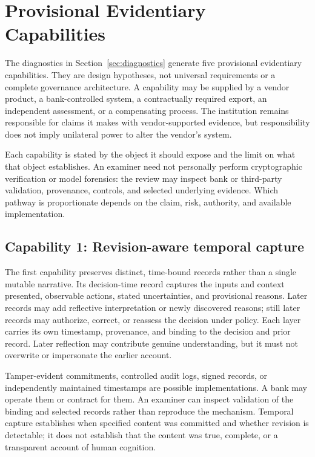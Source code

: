 
\section{Provisional Evidentiary Capabilities}
\label{sec:primitives}

The diagnostics in Section~\ref{sec:diagnostics} generate five provisional
evidentiary capabilities. They are design hypotheses, not universal
requirements or a complete governance architecture. A capability may be
supplied by a vendor product, a bank-controlled system, a contractually required
export, an independent assessment, or a compensating process. The institution
remains responsible for claims it makes with vendor-supported evidence, but
responsibility does not imply unilateral power to alter the vendor's system.

Each capability is stated by the object it should expose and the limit on what
that object establishes. An examiner need not personally perform cryptographic
verification or model forensics: the review may inspect bank or third-party
validation, provenance, controls, and selected underlying evidence. Which
pathway is proportionate depends on the claim, risk, authority, and available
implementation.

\subsection{Capability 1: Revision-aware temporal capture}
\label{sec:primitives:temporal-capture}

The first capability preserves distinct, time-bound records rather than a
single mutable narrative. Its decision-time record captures the inputs and context
presented, observable actions, stated uncertainties, and provisional reasons.
Later records may add reflective interpretation or newly discovered reasons;
still later records may authorize, correct, or reassess the decision under
policy. Each layer carries its own timestamp, provenance, and binding to the
decision and prior record. Later reflection may contribute genuine
understanding, but it must not overwrite or impersonate the earlier account.

Tamper-evident commitments, controlled audit logs, signed records, or
independently maintained timestamps are possible implementations. A bank may
operate them or contract for them. An examiner can inspect validation of the
binding and selected records rather than reproduce the mechanism. Temporal
capture establishes when specified content was committed and whether revision
is detectable; it does not establish that the content was true, complete, or a
transparent account of human cognition.

